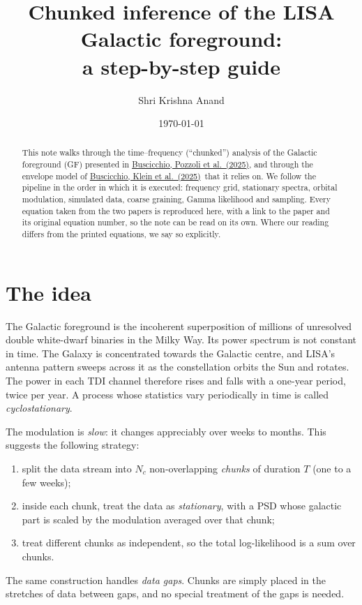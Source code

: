 \documentclass[11pt,a4paper]{article}
\title{Chunked inference of the LISA Galactic foreground:\\ a step-by-step guide}
\author{Shri Krishna Anand}
\date{\today}
\newcommand{\urlPone}{https://arxiv.org/pdf/2511.03604}
\newcommand{\urlPtwo}{https://arxiv.org/pdf/2410.08263}
\newcommand{\Pone}{\href{\urlPone}{Buscicchio, Pozzoli et al.~(2025)}}
\newcommand{\Ptwo}{\href{\urlPtwo}{Buscicchio, Klein et al.~(2025)}}
\begin{document}
\maketitle

\begin{abstract}
\noindent
This note walks through the time--frequency (``chunked'') analysis of the Galactic
foreground (GF) presented in \Pone, and through the envelope model of \Ptwo\ that it
relies on. We follow the pipeline in the order in which it is executed: frequency
grid, stationary spectra, orbital modulation, simulated data, coarse graining,
Gamma likelihood and sampling. Every equation taken from the two papers is reproduced
here, with a link to the paper and its original equation number, so the note can
be read on its own. Where our reading differs from the printed equations, we say so
explicitly.
\end{abstract}

\tableofcontents

\section{The idea}

The Galactic foreground is the incoherent superposition of millions of unresolved
double white-dwarf binaries in the Milky Way. Its power spectrum is not constant in
time. The Galaxy is concentrated towards the Galactic centre, and LISA's antenna
pattern sweeps across it as the constellation orbits the Sun and rotates. The power
in each TDI channel therefore rises and falls with a one-year period, twice per year.
A process whose statistics vary periodically in time is called
\emph{cyclostationary}.

The modulation is \emph{slow}: it changes appreciably over weeks to months. This
suggests the following strategy:
\begin{enumerate}
  \item split the data stream into $N_c$ non-overlapping \emph{chunks} of duration
        $T$ (one to a few weeks);
  \item inside each chunk, treat the data as \emph{stationary}, with a PSD whose
        galactic part is scaled by the modulation averaged over that chunk;
  \item treat different chunks as independent, so the total log-likelihood is a sum
        over chunks.
\end{enumerate}
The same construction handles \emph{data gaps}. Chunks are simply placed in the
stretches of data between gaps, and no special treatment of the gaps is needed.
\end{document}
